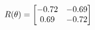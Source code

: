 \documentclass[preview]{standalone}
\begin{document}
\begin{align*}
\special{dvisvgm:raw <g id='unique000'>}R(\theta) = \begin{bmatrix}-0.72 & -0.69\\0.69 & -0.72\end{bmatrix}\special{dvisvgm:raw </g>}
\end{align*}
\end{document}
